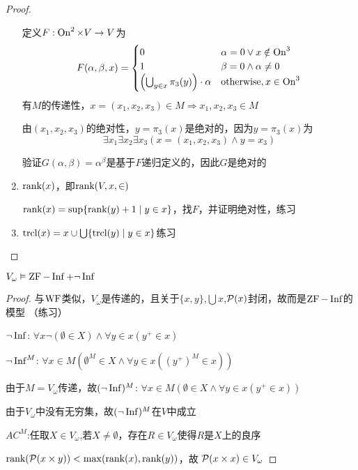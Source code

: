 \documentclass[11pt]{article}
\begin{document}
\begin{proof}
\begin{enumerate}
定义\(F:\operatorname{On}^2\times V\to V\)为
\begin{equation*}
F(\alpha,\beta,x)=
\begin{cases}
0&\alpha=0\vee x\notin\operatorname{On}^3\\
1&\beta=0\wedge\alpha\neq 0\\
\left( \bigcup_{y\in x}\pi_3(y) \right)\cdot\alpha&\text{otherwise},x\in\operatorname{On}^3
\end{cases}
\end{equation*}
有\(M\)的传递性，\(x=(x_1,x_2,x_3)\in M\Rightarrow x_1,x_2,x_3\in M\)

由\((x_1,x_2,x_3)\)的绝对性，\(y=\pi_3(x)\)是绝对的，因为\(y=\pi_3(x)\)为
\begin{equation*}
\exists x_1\exists x_2\exists x_3(x=(x_1,x_2,x_3)\wedge y=x_3)
\end{equation*}

验证\(G(\alpha,\beta)=\alpha^\beta\)是基于\(F\)递归定义的，因此\(G\)是绝对的

\item \(\text{rank}(x)\)，即\(\text{rank}(V,x,\in)\)

\(\text{rank}(x)=\sup\{\text{rank}(y)+1\mid y\in x\}\)，找\(F\)，并证明绝对性，练习

\item \(\operatorname{\text{trcl}}(x)=x\cup\bigcup\{\operatorname{\text{trcl}}(y)\mid y\in x\}\)练习
\end{enumerate}
\end{proof}

\begin{exercise}[7.10.9]
\(V_\omega\vDash\operatorname{ZF}-\operatorname{Inf}+\neg\operatorname{Inf}\)
\end{exercise}

\begin{proof}
与\(\operatorname{WF}\)类似，\(V_\omega\)是传递的，且关于\(\{x,y\}\),\(\bigcup x\),\(\mathcal{P}(x)\)封闭，故而是\(\operatorname{ZF}-\operatorname{Inf}\)的模型
（练习）

\(\neg\operatorname{Inf}\): \(\forall x\neg(\emptyset\in X)\wedge\forall y\in x(y^+\in x)\)

\(\neg\operatorname{Inf}^M\): \(\forall x\in M(\emptyset^M\in X\wedge\forall y\in x((y^+)^M\in x))\)

由于\(M=V_\omega\)传递，故\((\neg\operatorname{Inf})^M\): \(\forall x\in M(\emptyset\in X\wedge\forall y\in x(y^+\in x))\)

由于\(V_\omega\)中没有无穷集，故\((\neg\operatorname{Inf})^M\)在\(V\)中成立

\(AC^M\):任取\(X\in V_\omega\),若\(X\neq\emptyset\)，存在\(R\in V_\omega\)使得\(R\)是\(X\)上的良序

\(\text{rank}(\mathcal{P}(x\times y))<\max(\text{rank}(x),\text{rank}(y))\)，故
\(\mathcal{P}(x\times x)\in V_\omega\)
\end{proof}
\end{document}
